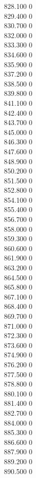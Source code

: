 { 828.100	0 \\
 829.400	0 \\
 830.700	0 \\
 832.000	0 \\
 833.300	0 \\
 834.600	0 \\
 835.900	0 \\
 837.200	0 \\
 838.500	0 \\
 839.800	0 \\
 841.100	0 \\
 842.400	0 \\
 843.700	0 \\
 845.000	0 \\
 846.300	0 \\
 847.600	0 \\
 848.900	0 \\
 850.200	0 \\
 851.500	0 \\
 852.800	0 \\
 854.100	0 \\
 855.400	0 \\
 856.700	0 \\
 858.000	0 \\
 859.300	0 \\
 860.600	0 \\
 861.900	0 \\
 863.200	0 \\
 864.500	0 \\
 865.800	0 \\
 867.100	0 \\
 868.400	0 \\
 869.700	0 \\
 871.000	0 \\
 872.300	0 \\
 873.600	0 \\
 874.900	0 \\
 876.200	0 \\
 877.500	0 \\
 878.800	0 \\
 880.100	0 \\
 881.400	0 \\
 882.700	0 \\
 884.000	0 \\
 885.300	0 \\
 886.600	0 \\
 887.900	0 \\
 889.200	0 \\
 890.500	0 \\
}
